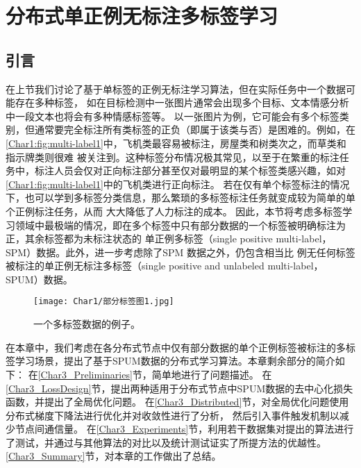 \chapter{分布式单正例无标注多标签学习}
\section{引言}
在上节我们讨论了基于单标签的正例无标注学习算法，但在实际任务中一个数据可能存在多种标签，
如在目标检测中一张图片通常会出现多个目标、文本情感分析中一段文本也将会有多种情感标签等\cite{Zhang_MultiLabel_2018}。
以一张图片为例，它可能会有多个标签类别，但通常要完全标注所有类标签的正负（即属于该类与否）是困难的。例如，在\autoref{Char1:fig:multi-label1}中，飞机类最容易被标注，房屋类和树类次之，而草类和指示牌类则很难
被关注到。这种标签分布情况极其常见，以至于在繁重的标注任务中，标注人员会仅对正向标注部分甚至仅对最明显的某个标签类感兴趣，如对\autoref{Char1:fig:multi-label1}中的飞机类进行正向标注\cite{Van_Inaturalist_2018}。
若在仅有单个标签标注的情况下，也可以学到多标签分类信息，那么繁琐的多标签标注任务就变成较为简单的单个正例标注任务，从而
{大大降低了人力标注的成本。}
因此，本节将考虑多标签学习领域中最极端的情况，即在多个标签中只有部分数据的一个标签被明确标注为正，其余标签都为未标注状态的
单正例多标签（single positive multi-label，SPM）数据。此外，进一步考虑除了SPM 数据之外，仍包含相当比
例无任何标签被标注的单正例无标注多标签（single positive and unlabeled multi-label，SPUM）数据。
\begin{figure}[htbp]
    \centering
    \texttt{[image: Char1/部分标签图1.jpg]}
    \caption{\label{Char1:fig:multi-label1}一个多标签数据的例子。}
\end{figure}

在本章中，我们考虑在各分布式节点中仅有部分数据的单个正例标签被标注的多标签学习场景，提出了基于SPUM数据的分布式学习算法。本章剩余部分的简介如下：
在\ref{Char3_Preliminaries}节，简单地进行了问题描述。
在\ref{Char3_LossDesign}节，提出两种适用于分布式节点中SPUM数据的去中心化损失函数，并提出了全局优化问题。
在\ref{Char3_Distributed}节，对全局优化问题使用分布式梯度下降法进行优化并对收敛性进行了分析，
然后引入事件触发机制以减少节点间通信量。
在\ref{Char3_Experiments}节，利用若干数据集对提出的算法进行了测试，并通过与其他算法的对比以及统计测试证实了所提方法的优越性。
\ref{Char3_Summary}节，对本章的工作做出了总结。

